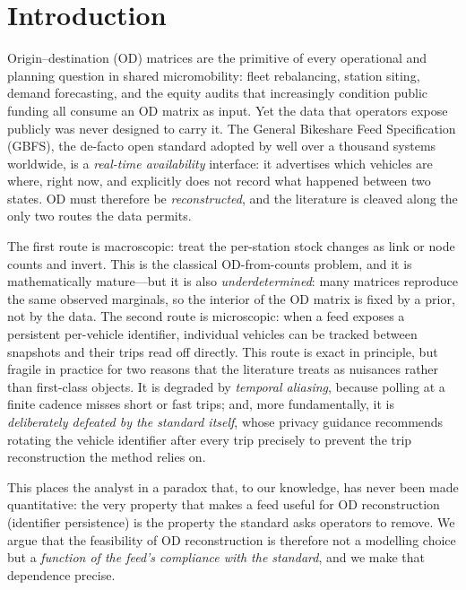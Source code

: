 \section{Introduction}
\label{sec:intro}

Origin--destination (OD) matrices are the primitive of every operational and
planning question in shared micromobility: fleet rebalancing, station siting,
demand forecasting, and the equity audits that increasingly condition public
funding all consume an OD matrix as input. Yet the data that operators expose
publicly was never designed to carry it. The General Bikeshare Feed
Specification (GBFS), the de-facto open standard adopted by well over a
thousand systems worldwide, is a \emph{real-time availability} interface: it
advertises which vehicles are where, right now, and explicitly does not record
what happened between two states. OD must therefore be \emph{reconstructed},
and the literature is cleaved along the only two routes the data permits.

The first route is macroscopic: treat the per-station stock changes as link or
node counts and invert. This is the classical OD-from-counts problem, and it is
mathematically mature---but it is also \emph{underdetermined}: many matrices
reproduce the same observed marginals, so the interior of the OD matrix is
fixed by a prior, not by the data. The second route is microscopic: when a feed
exposes a persistent per-vehicle identifier, individual vehicles can be tracked
between snapshots and their trips read off directly. This route is exact in
principle, but fragile in practice for two reasons that the literature treats as
nuisances rather than first-class objects. It is degraded by \emph{temporal
aliasing}, because polling at a finite cadence misses short or fast trips; and,
more fundamentally, it is \emph{deliberately defeated by the standard itself},
whose privacy guidance recommends rotating the vehicle identifier after every
trip precisely to prevent the trip reconstruction the method relies on.

This places the analyst in a paradox that, to our knowledge, has never been made
quantitative: the very property that makes a feed useful for OD reconstruction
(identifier persistence) is the property the standard asks operators to remove.
We argue that the feasibility of OD reconstruction is therefore not a modelling
choice but a \emph{function of the feed's compliance with the standard}, and we
make that dependence precise.

